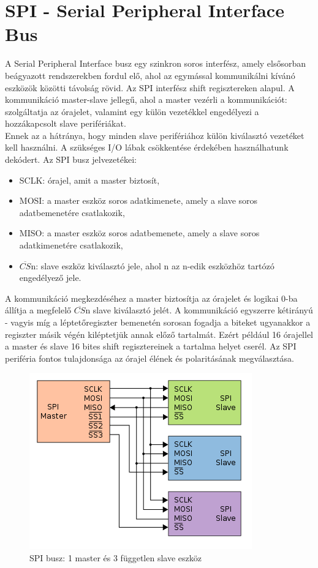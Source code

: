 \documentclass[a4paper,11pt]{article}
\begin{document}
\section{SPI - Serial Peripheral Interface Bus}
A Serial Peripheral Interface busz egy szinkron soros interfész, amely elsősorban beágyazott rendszerekben fordul elő, ahol az egymással kommunikálni kívánó eszközök közötti távolság rövid. Az SPI interfész shift regisztereken alapul. A kommunikáció master-slave jellegű, ahol a master vezérli a kommunikációt: szolgáltatja az órajelet, valamint egy külön vezetékkel engedélyezi a hozzákapcsolt slave perifériákat.\\
Ennek az a hátránya, hogy minden slave perifériához külön kiválasztó vezetéket kell használni. A szükséges I/O lábak csökkentése érdekében használhatunk dekódert. 
Az SPI busz jelvezetékei:
\begin{itemize}
	\item SCLK: órajel, amit a master biztosít,
	\item MOSI: a master eszköz soros adatkimenete, amely a slave soros adatbemenetére csatlakozik,
	\item MISO: a master eszköz soros adatbemenete, amely a slave soros adatkimenetére csatlakozik,
	\item $\overline{CS}$n: slave eszköz kiválasztó jele, ahol n az n-edik eszközhöz tartózó engedélyező jele.
\end{itemize}
A kommunikáció megkezdéséhez a master biztosítja az órajelet és logikai 0-ba állítja a megfelelő $\overline{CS}$n slave kiválasztó jelét. A kommunikáció egyszerre kétirányú - vagyis míg a léptetőregiszter bemenetén sorosan fogadja a biteket ugyanakkor a regiszter másik végén kiléptetjük annak előző tartalmát. Ezért például 16 órajellel a master és slave 16 bites shift regisztereinek a tartalma helyet cserél. Az SPI periféria fontos tulajdonsága az órajel élének és polaritásának megválasztása.
\begin{figure}[H]
	\begin{center}
	\includegraphics[scale=0.7]{SPI_three_slaves.png}
	\caption{SPI busz: 1 master és 3 független slave eszköz}
	\label{fig:SPI_three_slaves}
	\end{center}
\end{figure}
\end{document}
